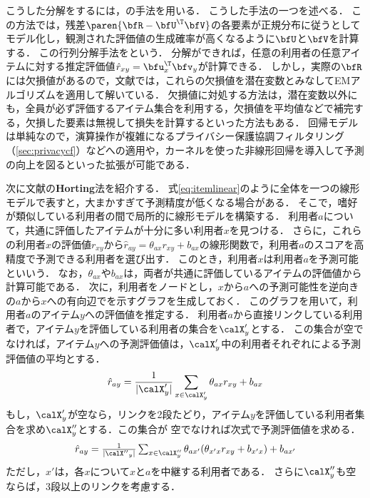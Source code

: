 こうした分解をするには，の手法を用いる．
こうした手法の一つ\cite{sigir:02:01}を述べる．
この方法では，残差$\paren{\bfR-\bfU^\T\bfV}$の各要素が正規分布に従うとしてモデル化し，観測された評価値の生成確率が高くなるように$\bfU$と$\bfV$を計算する．
この行列分解手法をという．
分解ができれば，任意の利用者の任意アイテムに対する推定評価値$\hat{r}_{xy}=\bfu_x^\T \bfv_y$が計算できる．
しかし，実際の$\bfR$には欠損値があるので，文献\cite{sigir:02:01}では，これらの欠損値を潜在変数とみなしてEMアルゴリズム\cite{jrss:77:01}を適用して解いている．
欠損値に対処する方法は，潜在変数以外にも，全員が必ず評価するアイテム集合を利用する，欠損値を平均値などで補完する，欠損した要素は無視して損失を計算する\cite{kdd:07:01}といった方法もある．
回帰モデルは単純なので，演算操作が複雑になるプライバシー保護協調フィルタリング（\ref{sec:privacycf}）などへの適用や，カーネルを使った非線形回帰を導入して予測の向上を図るといった拡張が可能である．

次に文献\cite{kdd:99:04}の\textbf{Horting}法を紹介する．
式\eqref{eq:itemlinear}のように全体を一つの線形モデルで表すと，大まかすぎて予測精度が低くなる場合がある．
そこで，嗜好が類似している利用者の間で局所的に線形モデルを構築する．
利用者$a$について，共通に評価したアイテムが十分に多い利用者$x$を見つける．
さらに，これらの利用者$x$の評価値$r_{xy}$から$\hat{r}_{ay}=\theta_{ax}r_{xy} + b_{ax}$の線形関数で，利用者$a$のスコアを高精度で予測できる利用者を選び出す．
このとき，利用者$x$は利用者$a$を予測可能といいう．
なお，$\theta_{ax}$や$b_{ax}$は，両者が共通に評価しているアイテムの評価値から計算可能である．
次に，利用者をノードとし，$x$から$a$への予測可能性を逆向きの$a$から$x$への有向辺でを示すグラフを生成しておく．
このグラフを用いて，利用者$a$のアイテム$y$への評価値を推定する．
利用者$a$から直接リンクしている利用者で，アイテム$y$を評価している利用者の集合を$\calX'_y$とする．
この集合が空でなければ，アイテム$y$への予測評価値は，$\calX'_y$中の利用者それぞれによる予測評価値の平均とする．
\[
 \hat{r}_{ay}=\frac{1}{|\calX'_y|}
\sum_{x\in\calX'_y}\theta_{ax}r_{xy} + b_{ax}
\]
もし，$\calX'_y$が空なら，リンクを2段たどり，アイテム$y$を評価している利用者集合を求め$\calX''_y$とする．この集合が
空でなければ次式で予測評価値を求める．
\[
\textstyle
 \hat{r}_{ay}=\frac{1}{|{\calX''}_y|}\sum_{x\in\calX''_y}\theta_{ax'}(\theta_{x'x}r_{xy} + b_{x'x}) + b_{ax'} 
\]
ただし，$x'$は，各$x$について$x$と$a$を中継する利用者である．
さらに$\calX''_y$も空ならば，3段以上のリンクを考慮する．

